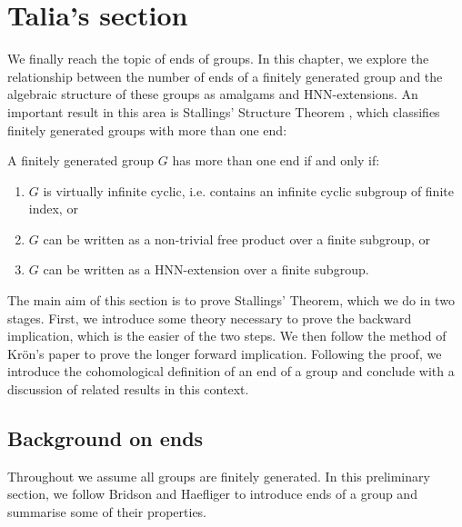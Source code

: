 \newpage %
\section{Talia's section}


We finally reach the topic of ends of groups. In this chapter, we explore the relationship between the number of ends of a finitely generated group and the algebraic structure of these groups as amalgams and HNN-extensions. An important result in this area is Stallings’ Structure Theorem \cite[p.~4]{S71}, which classifies finitely generated groups with more than one end:

\begin{theorem} 
\label{SST}
A finitely generated group \(G\) has more than one end if and only if:
    \begin{enumerate}
        \item \(G\) is virtually infinite cyclic, i.e. contains an infinite cyclic subgroup of finite index, or
        \item \(G\) can be written as a non-trivial free product over a finite subgroup, or
        \item \(G\) can be written as a HNN-extension over a finite subgroup. 
    \end{enumerate}
\end{theorem}

The main aim of this section is to prove Stallings' Theorem, which we do in two stages. First, we introduce some theory necessary to prove the backward implication, which is the easier of the two steps. We then follow the method of Kr{\"o}n's paper \cite{K10} to prove the longer forward implication. 
Following the proof, we introduce the cohomological definition of an end of a group and conclude with a discussion of related results in this context. %

\subsection{Background on ends}
Throughout we assume all groups are finitely generated. In this preliminary section, we follow Bridson and Haefliger \cite[p.~144--148]{bridson_haefliger_metric_1999} to introduce ends of a group and summarise some of their properties. 

